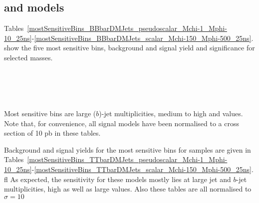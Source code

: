 \clearpage
\subsection{\DMbb and \DMtt models}



Tables~\ref{mostSensitiveBins_BBbarDMJets_pseudoscalar_Mchi-1_Mphi-10_25ns}-\ref{mostSensitiveBins_BBbarDMJets_scalar_Mchi-150_Mphi-500_25ns}.
show the five most sensitive bins, background and signal yield and significance for selected \DMbb masses.

\\
\\
\\
\\

Most sensitive bins are large ($b$)-jet multiplicities, medium to high \scalht and \mht values. Note that, for convenience, all signal models have been normalised to a cross section of 10 pb in these tables.

\clearpage

Background and signal yields for the most sensitive bins for \DMtt samples are given in Tables~\ref{mostSensitiveBins_TTbarDMJets_pseudoscalar_Mchi-1_Mphi-10_25ns}-\ref{mostSensitiveBins_TTbarDMJets_scalar_Mchi-150_Mphi-500_25ns}.
fl
As expected, the sensitivity for these models mostly lies at large jet and $b$-jet multiplicities, high \scalht as well as large \mht values. Also these tables are all normalised to $\sigma=10$\ipb


\\
\\
\\
\\



\clearpage

